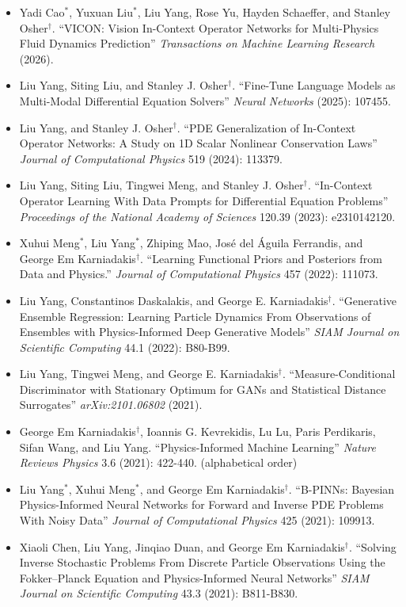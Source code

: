 \begin{itemize}[leftmargin=*]
\item Yadi Cao$^*$, Yuxuan Liu$^*$, {Liu Yang}, Rose Yu, Hayden Schaeffer, and Stanley Osher$^\dagger$. ``VICON: Vision In-Context Operator Networks for Multi-Physics Fluid Dynamics Prediction'' \textit{Transactions on Machine Learning Research} (2026).
\item {Liu Yang}, Siting Liu, and Stanley J. Osher$^\dagger$. ``Fine-Tune Language Models as Multi-Modal Differential Equation Solvers'' \textit{Neural Networks} (2025): 107455.
\item {Liu Yang}, and Stanley J. Osher$^\dagger$. ``PDE Generalization of In-Context Operator Networks: A Study on 1D Scalar Nonlinear Conservation Laws'' \textit{Journal of Computational Physics} 519 (2024): 113379.
\item {Liu Yang}, Siting Liu, Tingwei Meng, and Stanley J. Osher$^\dagger$. ``In-Context Operator Learning With Data Prompts for Differential Equation Problems'' \textit{Proceedings of the National Academy of Sciences} 120.39 (2023): e2310142120.
\item Xuhui Meng$^*$, {Liu Yang}$^*$, Zhiping Mao, José del Águila Ferrandis, and George Em Karniadakis$^\dagger$. ``Learning Functional Priors and Posteriors from Data and Physics.'' \textit{Journal of Computational Physics} 457 (2022): 111073.
\item {Liu Yang}, Constantinos Daskalakis, and George E. Karniadakis$^\dagger$. ``Generative Ensemble Regression: Learning Particle Dynamics From Observations of Ensembles with Physics-Informed Deep Generative Models'' \textit{SIAM Journal on Scientific Computing} 44.1 (2022): B80-B99.
\item {Liu Yang}, Tingwei Meng, and George E. Karniadakis$^\dagger$. ``Measure-Conditional Discriminator with Stationary Optimum for GANs and Statistical Distance Surrogates'' \textit{arXiv:2101.06802} (2021).
\item George Em Karniadakis$^\dagger$, Ioannis G. Kevrekidis, Lu Lu, Paris Perdikaris, Sifan Wang, and {Liu Yang}. ``Physics-Informed Machine Learning'' \textit{Nature Reviews Physics} 3.6 (2021): 422-440. (alphabetical order)
\item {Liu Yang}$^*$, Xuhui Meng$^*$, and George Em Karniadakis$^\dagger$. ``B-PINNs: Bayesian Physics-Informed Neural Networks for Forward and Inverse PDE Problems With Noisy Data'' \textit{Journal of Computational Physics} 425 (2021): 109913.
\item Xiaoli Chen, {Liu Yang}, Jinqiao Duan, and George Em Karniadakis$^\dagger$. ``Solving Inverse Stochastic Problems From Discrete Particle Observations Using the Fokker--Planck Equation and Physics-Informed Neural Networks'' \textit{SIAM Journal on Scientific Computing} 43.3 (2021): B811-B830.

\end{itemize}
